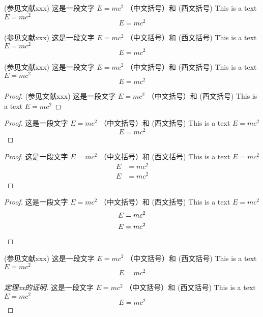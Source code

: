 \begin{definition}
  (参见文献xxx) 这是一段文字 $E = m c^2$  （中文括号）和 (西文括号) 
  This is a text $E = m c^2$
  \[
    E = m c^2
  \]
\end{definition}

\begin{definition}[测度 measure]
  (参见文献xxx) 这是一段文字 $E = m c^2$  （中文括号）和 (西文括号) 
  This is a text $E = m c^2$
  \[
    E = m c^2
  \]
\end{definition}

\begin{theorem}
  (参见文献xxx) 这是一段文字 $E = m c^2$  （中文括号）和 (西文括号) 
  This is a text $E = m c^2$
  \[
    E = m c^2
  \]
\end{theorem}

\begin{proof}
  (参见文献xxx) 这是一段文字 $E = m c^2$  （中文括号）和 (西文括号) 
  This is a text $E = m c^2$
\end{proof}

\begin{proof}
  这是一段文字 $E = m c^2$  （中文括号）和 (西文括号) 
  This is a text $E = m c^2$
  \[
    E = m c^2
  \]
\end{proof}

\begin{proof}
  这是一段文字 $E = m c^2$  （中文括号）和 (西文括号) 
  This is a text $E = m c^2$
  \begin{align*}
    E &= m c^2 \\
    E &= m c^2 
  \end{align*}
\end{proof}

\begin{proof}
  这是一段文字 $E = m c^2$  （中文括号）和 (西文括号) 
  This is a text $E = m c^2$
  \begin{align*}
    E &= m c^2 \\
    E &= m c^2  \qedhere
  \end{align*}
\end{proof}

\begin{theorem}[测度 measure]
  (参见文献xxx) 这是一段文字 $E = m c^2$  （中文括号）和 (西文括号) 
  This is a text $E = m c^2$
  \[
    E = m c^2
  \]
\end{theorem}

\begin{proof}[定理xx的证明]
 这是一段文字 $E = m c^2$  （中文括号）和 (西文括号) 
  This is a text $E = m c^2$
  \[
    E = m c^2
  \]
\end{proof}


